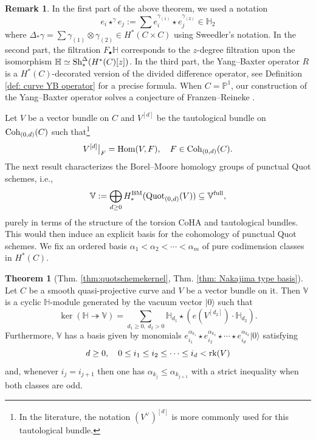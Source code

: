 \documentclass[10pt]{amsart}
\newcommand{\BP}{\mathbb{P}}
\newcommand{\BH}{\mathbb{H}}
\newcommand{\BV}{\mathbb{V}}
\newcommand{\Quot}{\textnormal{Quot}}
\newcommand{\Coh}{\textnormal{Coh}}
\newcommand{\Hom}{\textnormal{Hom}}
\newcommand{\BM}{\textnormal{BM}}
\newcommand{\+}{{}^+}
\newcommand{\full}{\textnormal{full}}
\newcommand{\rk}{\textnormal{rk}}
\newcommand{\Sh}{\textnormal{Sh}}
\newcommand{\vac}{|0\rangle}
\theoremstyle{definition}
\theoremstyle {definition}
\newtheorem{remark}[theorem]{Remark}
\theoremstyle {definition}
\newtheorem{introtheorem}{Theorem}
\begin{document}
\begin{remark}
In the first part of the above theorem, we used a notation 
$$e_i\star^\gamma e_j:=\sum e_i^{\gamma_{(1)}}\star e_j^{\gamma_{(2)}}\in \BH_2
$$
where $\Delta_*\gamma=\sum \gamma_{(1)}\otimes \gamma_{(2)}\in H^*(C\times C)$ using Sweedler's notation. In the second part, the filtration $F_\bullet \BH$ corresponds to the $z$-degree filtration upon the isomorphism $\BH\simeq \Sh^\Delta_{*}(H^*(C)[z])$. In the third part, the Yang--Baxter operator $R$ is a $H^*(C)$-decorated version of the divided difference operator, see Definition \ref{def: curve YB operator} for a precise formula. When $C=\BP^1$, our construction of the Yang--Baxter operator solves a conjecture of Franzen--Reineke \cite[Conj. 5]{franzen2019cohomological}.
\end{remark}

Let $V$ be a vector bundle on $C$ and $V^{[d]}$ be the tautological bundle on $\Coh_{(0,d)}(C)$ such that\footnote{In the literature, the notation $(V^\vee)^{[d]} $ is more commonly used for this tautological bundle.}
$$V^{[d]}\big|_F=\Hom(V,F),\quad F\in \Coh_{(0,d)}(C).
$$
The next result characterizes the Borel--Moore homology groups of punctual Quot schemes, i.e., 
$$ \BV:=\bigoplus_{d\geq 0}H^\BM_*(\Quot_{(0,d)}(V))\subseteq \BV^\full, 
$$
purely in terms of the structure of the torsion CoHA and tautological bundles. This would then induce an explicit basis for the cohomology of punctual Quot schemes. We fix an ordered basis $\alpha_1 < \alpha_2 <  \cdots< \alpha_m $ of pure codimension classes in $H^{*}(C)$. 


\begin{introtheorem}[Thm. \ref{thm:quotschemekernel}, Thm. \ref{thm: Nakajima type basis}]
    Let $C$ be a smooth quasi-projective curve and $V$ be a vector bundle on it. Then $\BV$ is a cyclic $\BH$-module generated by the vacuum vector $|0\rangle$ such that
    $$\ker(\BH\twoheadrightarrow\BV)=\sum_{d_1\geq 0,\ d_2>0}\BH_{d_1}\star(e(V^{[d_2]})\cdot \BH_{d_2}). 
    $$
    Furthermore, $\BV$ has a basis given by monomials $e^{\alpha_{k_1}}_{i_1} \star e^{\alpha_{k_2}}_{i_2} \star \cdots \star e^{\alpha_{k_d}}_{i_d} \vac$ satisfying
\[ d\geq 0,\quad 0\leq i_1 \leq i_2\leq \cdots \leq i_d < \rk(V)\] and, whenever $i_j=i_{j+1}$ then one has $\alpha_{k_j} \leq \alpha_{k_{j+1}}$ with a strict inequality when both classes are odd.
\end{introtheorem}
\end{document}
